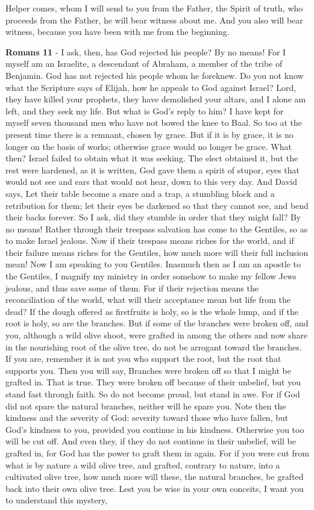 \documentclass[11pt]{article}
\begin{document}
Helper comes, whom I will send to you from the Father, the Spirit of truth, who proceeds from the Father, he will bear witness about me. And you also will bear witness, because you have been with me from the beginning.

\textbf{Romans 11} - I ask, then, has God rejected his people? By no means! For I myself am an Israelite, a descendant of Abraham, a member of the tribe of Benjamin. God has not rejected his people whom he foreknew. Do you not know what the Scripture says of Elijah, how he appeals to God against Israel? Lord, they have killed your prophets, they have demolished your altars, and I alone am left, and they seek my life. But what is God's reply to him? I have kept for myself seven thousand men who have not bowed the knee to Baal. So too at the present time there is a remnant, chosen by grace. But if it is by grace, it is no longer on the basis of works; otherwise grace would no longer be grace. What then? Israel failed to obtain what it was seeking. The elect obtained it, but the rest were hardened, as it is written, God gave them a spirit of stupor, eyes that would not see and ears that would not hear, down to this very day. And David says, Let their table become a snare and a trap, a stumbling block and a retribution for them; let their eyes be darkened so that they cannot see, and bend their backs forever. So I ask, did they stumble in order that they might fall? By no means! Rather through their trespass salvation has come to the Gentiles, so as to make Israel jealous. Now if their trespass means riches for the world, and if their failure means riches for the Gentiles, how much more will their full inclusion mean! Now I am speaking to you Gentiles. Inasmuch then as I am an apostle to the Gentiles, I magnify my ministry in order somehow to make my fellow Jews jealous, and thus save some of them. For if their rejection means the reconciliation of the world, what will their acceptance mean but life from the dead? If the dough offered as firstfruits is holy, so is the whole lump, and if the root is holy, so are the branches. But if some of the branches were broken off, and you, although a wild olive shoot, were grafted in among the others and now share in the nourishing root of the olive tree, do not be arrogant toward the branches. If you are, remember it is not you who support the root, but the root that supports you. Then you will say, Branches were broken off so that I might be grafted in. That is true. They were broken off because of their unbelief, but you stand fast through faith. So do not become proud, but stand in awe. For if God did not spare the natural branches, neither will he spare you. Note then the kindness and the severity of God: severity toward those who have fallen, but God's kindness to you, provided you continue in his kindness. Otherwise you too will be cut off. And even they, if they do not continue in their unbelief, will be grafted in, for God has the power to graft them in again. For if you were cut from what is by nature a wild olive tree, and grafted, contrary to nature, into a cultivated olive tree, how much more will these, the natural branches, be grafted back into their own olive tree. Lest you be wise in your own conceits, I want you to understand this mystery, 
\end{document}
